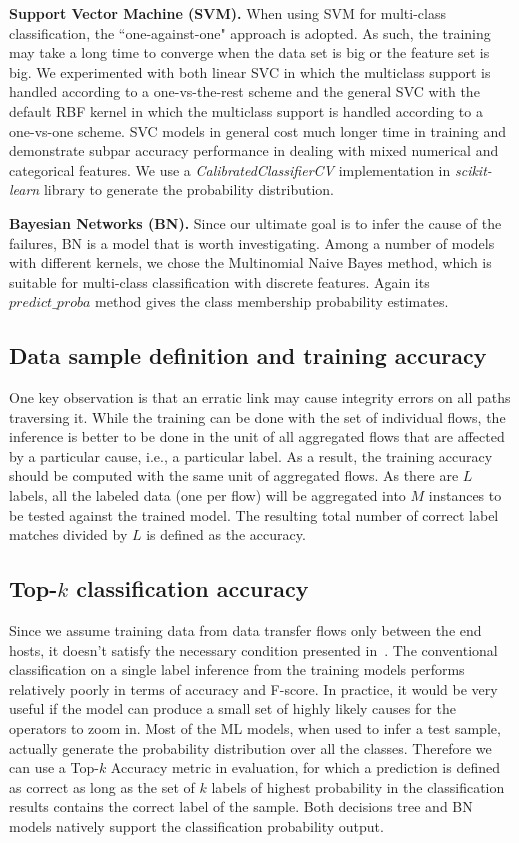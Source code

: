 {\bf Support Vector Machine (SVM).} When using SVM for multi-class classification, the ``one-against-one" approach is adopted. As such, the training may take a long time to converge when the data set is big or the feature set is big. We experimented with both linear SVC in which the multiclass support is handled according to a one-vs-the-rest scheme and the general SVC with the default RBF kernel in which the multiclass support is handled according to a one-vs-one scheme.  SVC models in general cost much longer time in training and demonstrate subpar accuracy performance in dealing with mixed numerical and categorical features.  We use a \emph{CalibratedClassifierCV} implementation in {\it scikit-learn} library to generate the probability distribution.

{\bf Bayesian Networks (BN).} Since our ultimate goal is to infer the cause of the failures, BN is a model that is worth investigating. Among a number of models with different kernels, we chose the Multinomial Naive Bayes method, which is suitable for multi-class classification with discrete features. Again its $predict\_proba$ method gives the class membership probability estimates.

\subsection{Data sample definition and training accuracy}
One key observation is that an erratic link may cause integrity errors on all paths traversing it. While the training can be done with the set of individual flows, the inference is better to be done in the unit of all aggregated flows that are affected by a particular cause, i.e., a particular label. As a result, the training accuracy should be computed with the same unit of aggregated flows. As there are $L$ labels, all the labeled data (one per flow) will be aggregated into $M$ instances to be tested against the trained model. The resulting total number of correct label matches divided by $L$ is defined as the accuracy.

\subsection{Top-$k$ classification accuracy} 
Since we assume training data from data transfer flows only between the end hosts, it doesn't satisfy the necessary condition presented in~\cite{netbouncer:nsdi18}. The conventional classification on a single label inference from the training models performs relatively poorly in terms of accuracy and F-score. In practice, it would be very useful if the model can produce a small set of highly likely causes for the operators to zoom in. Most of the ML models, when used to infer a test sample, actually generate the probability distribution over all the classes. Therefore we can use a Top-$k$ Accuracy metric in evaluation, for which a prediction is defined as correct as long as the set of $k$ labels of highest probability in the classification results contains the correct label of the sample. Both decisions tree and BN models natively support the classification probability output. 

